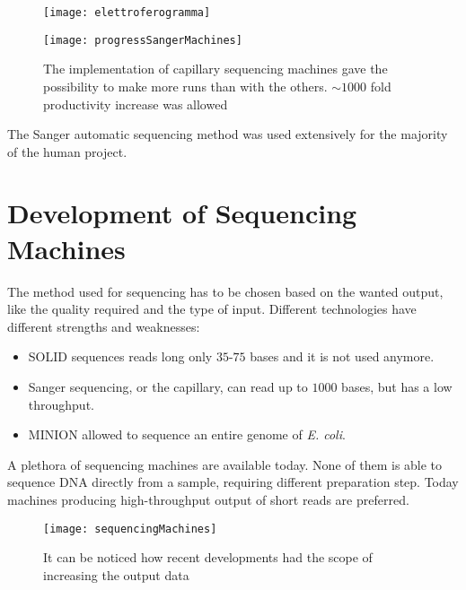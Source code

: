         \begin{figure}[h]
        \caption{}
        \centering
        \texttt{[image: elettroferogramma]}
        \label{}
    \end{figure}

    \begin{figure}[h]
        \centering
        \texttt{[image: progressSangerMachines]}
        \caption{The implementation of capillary sequencing machines gave the possibility to make more runs than with the others.
                    $\sim 1000$ fold productivity increase was allowed
                }
        \label{}
    \end{figure}

    The Sanger automatic sequencing method was used extensively for the majority of the human project.

\section{Development of Sequencing Machines}
The method used for sequencing has to be chosen based on the wanted output, like the quality required and the type of input.
Different technologies have different strengths and weaknesses:

\begin{multicols}{2}
    \begin{itemize}
        \item SOLID sequences reads long only $35$-$75$ bases and it is not used anymore.
        \item Sanger sequencing, or the capillary, can read up to $1000$ bases, but has a low throughput.
        \item MINION allowed to sequence an entire genome of \textit{E. coli}.
    \end{itemize}
\end{multicols}

A plethora of sequencing machines are available today.
None of them is able to sequence DNA directly from a sample, requiring different preparation step.
Today machines producing high-throughput output of short reads are preferred.

\begin{figure}[H]
\centering
\texttt{[image: sequencingMachines]}
\caption{It can be noticed how recent developments had the scope of increasing the output data}
\label{}
\end{figure}

